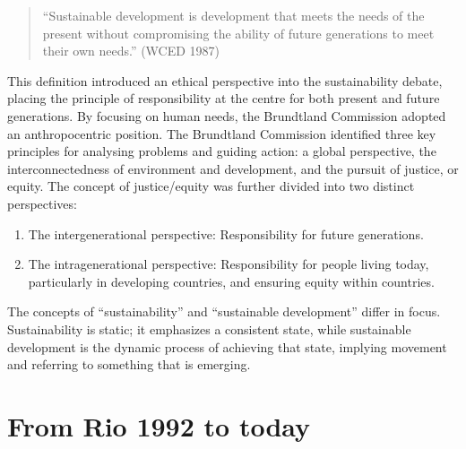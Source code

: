 \documentclass[
  a4paper,
  openany]{book}
\providecommand{\tightlist}{%
  \setlength{\itemsep}{0pt}\setlength{\parskip}{0pt}}
\begin{document}
\begin{quote}
``Sustainable development is development that meets the needs of the
present without compromising the ability of future generations to meet
their own needs.'' (WCED 1987)
\end{quote}

This definition introduced an ethical perspective into the
sustainability debate, placing the principle of responsibility at the
centre for both present and future generations. By focusing on human
needs, the Brundtland Commission adopted an anthropocentric position.
The Brundtland Commission identified three key principles for analysing
problems and guiding action: a global perspective, the
interconnectedness of environment and development, and the pursuit of
justice, or equity. The concept of justice/equity was further divided
into two distinct perspectives:

\begin{enumerate}
\def\labelenumi{\arabic{enumi}.}
\tightlist
\item
  The intergenerational perspective: Responsibility for future
  generations.
\item
  The intragenerational perspective: Responsibility for people living
  today, particularly in developing countries, and ensuring equity
  within countries.
\end{enumerate}

\begin{tcolorbox}[enhanced jigsaw, left=2mm, arc=.35mm, titlerule=0mm, opacityback=0, leftrule=.75mm, title={Sustainability and sustainable development}, breakable, bottomtitle=1mm, rightrule=.15mm, coltitle=black, toptitle=1mm, bottomrule=.15mm, colback=white, opacitybacktitle=0.6, colbacktitle=quarto-callout-note-color!10!white, toprule=.15mm, colframe=quarto-callout-note-color-frame]

The concepts of ``sustainability'' and ``sustainable development''
differ in focus. Sustainability is static; it emphasizes a consistent
state, while sustainable development is the dynamic process of achieving
that state, implying movement and referring to something that is
emerging.

\end{tcolorbox}

\section{From Rio 1992 to today}\label{from-rio-1992-to-today}
\end{document}
